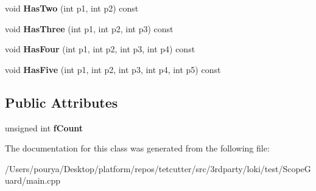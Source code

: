 \begin{DoxyCompactItemize}
\item 
\hypertarget{classUser_aae97afb709b1e79840390dff2cc9d79a}{}void {\bfseries Has\+Two} (int p1, int p2) const \label{classUser_aae97afb709b1e79840390dff2cc9d79a}

\item 
\hypertarget{classUser_a9e5873deff4922d827a5779e8b9bf979}{}void {\bfseries Has\+Three} (int p1, int p2, int p3) const \label{classUser_a9e5873deff4922d827a5779e8b9bf979}

\item 
\hypertarget{classUser_a7371ef54086a95d7331d71ac5778443b}{}void {\bfseries Has\+Four} (int p1, int p2, int p3, int p4) const \label{classUser_a7371ef54086a95d7331d71ac5778443b}

\item 
\hypertarget{classUser_a446c5d68ae4400081403401ecbc2f3db}{}void {\bfseries Has\+Five} (int p1, int p2, int p3, int p4, int p5) const \label{classUser_a446c5d68ae4400081403401ecbc2f3db}

\end{DoxyCompactItemize}
\subsection*{Public Attributes}
\begin{DoxyCompactItemize}
\item 
\hypertarget{classUser_ad62679d9bfa1648ba6e9ee6fc5fb9b86}{}unsigned int {\bfseries f\+Count}\label{classUser_ad62679d9bfa1648ba6e9ee6fc5fb9b86}

\end{DoxyCompactItemize}


The documentation for this class was generated from the following file\+:\begin{DoxyCompactItemize}
\item 
/\+Users/pourya/\+Desktop/platform/repos/tetcutter/src/3rdparty/loki/test/\+Scope\+Guard/main.\+cpp\end{DoxyCompactItemize}
